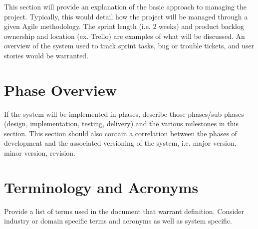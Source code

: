 This section will provide an explanation of the basic approach to managing the 
project.  Typically, this would detail how the project will be managed through 
a given Agile methodology.  The sprint length (i.e. 2 weeks) and product backlog 
ownership and location (ex. Trello) are examples of what will be discussed.  An 
overview of the system used to track sprint tasks, bug or trouble tickets, and 
user stories would be warranted. 


\section{Phase  Overview}


If the system will be implemented in phases, describe those phases/sub-phases (design, 
implementation, testing, delivery) and the various milestones in this section. 
 This section should also contain a correlation between the phases of development 
and the associated versioning of the system, i.e. major version, minor version, 
revision. 

\section{Terminology and Acronyms}
Provide a list of terms used in the document that warrant definition.  Consider 
industry or domain specific terms and acronyms as well as system specific. 
